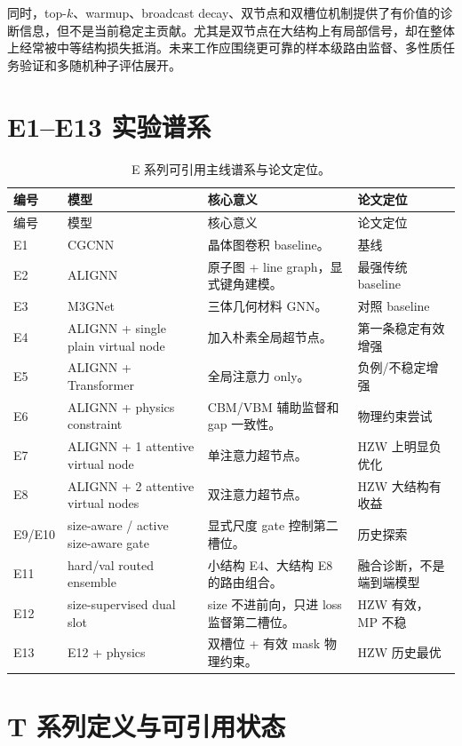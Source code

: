 \documentclass[UTF8,a4paper,11pt]{ctexart}
\begin{document}
同时，top-$k$、warmup、broadcast decay、双节点和双槽位机制提供了有价值的诊断信息，但不是当前稳定主贡献。尤其是双节点在大结构上有局部信号，却在整体上经常被中等结构损失抵消。未来工作应围绕更可靠的样本级路由监督、多性质任务验证和多随机种子评估展开。

\appendix

\section{E1--E13 实验谱系}

\begin{longtable}{p{1.4cm} p{4.2cm} p{6.2cm} p{3.2cm}}
\caption{E 系列可引用主线谱系与论文定位。}
\label{tab:e-lineage}\\
\toprule
编号 & 模型 & 核心意义 & 论文定位 \\
\midrule
\endfirsthead
\toprule
编号 & 模型 & 核心意义 & 论文定位 \\
\midrule
\endhead
E1 & CGCNN & 晶体图卷积 baseline。 & 基线 \\
E2 & ALIGNN & 原子图 + line graph，显式键角建模。 & 最强传统 baseline \\
E3 & M3GNet & 三体几何材料 GNN。 & 对照 baseline \\
E4 & ALIGNN + single plain virtual node & 加入朴素全局超节点。 & 第一条稳定有效增强 \\
E5 & ALIGNN + Transformer & 全局注意力 only。 & 负例/不稳定增强 \\
E6 & ALIGNN + physics constraint & CBM/VBM 辅助监督和 gap 一致性。 & 物理约束尝试 \\
E7 & ALIGNN + 1 attentive virtual node & 单注意力超节点。 & HZW 上明显负优化 \\
E8 & ALIGNN + 2 attentive virtual nodes & 双注意力超节点。 & HZW 大结构有收益 \\
E9/E10 & size-aware / active size-aware gate & 显式尺度 gate 控制第二槽位。 & 历史探索 \\
E11 & hard/val routed ensemble & 小结构 E4、大结构 E8 的路由组合。 & 融合诊断，不是端到端模型 \\
E12 & size-supervised dual slot & size 不进前向，只进 loss 监督第二槽位。 & HZW 有效，MP 不稳 \\
E13 & E12 + physics & 双槽位 + 有效 mask 物理约束。 & HZW 历史最优 \\
\bottomrule
\end{longtable}

\section{T 系列定义与可引用状态}
\end{document}
